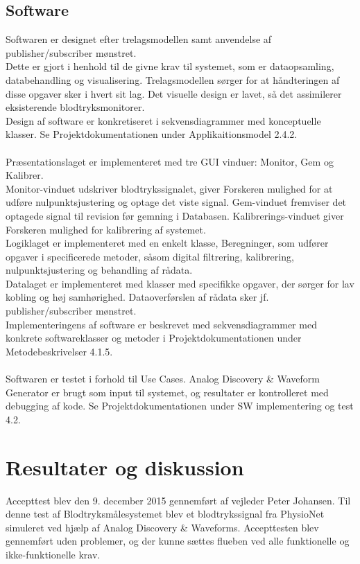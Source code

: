 \subsection{Software}
Softwaren er designet efter trelagsmodellen samt anvendelse af publisher/subscriber mønstret. \\
Dette er gjort i henhold til de givne krav til systemet, som er dataopsamling, databehandling og visualisering. Trelagsmodellen sørger for at håndteringen af disse opgaver sker i hvert sit lag. Det visuelle design er lavet, så det assimilerer eksisterende blodtryksmonitorer. \\
Design af software er konkretiseret i sekvensdiagrammer med konceptuelle klasser. Se Projektdokumentationen under Applikaitionsmodel 2.4.2.  
\\\\
Præsentationslaget er implementeret med tre GUI vinduer: Monitor, Gem og Kalibrer.\\ 
Monitor-vinduet udskriver blodtrykssignalet, giver Forskeren mulighed for at udføre nulpunktsjustering og optage det viste signal. Gem-vinduet fremviser det optagede signal til revision før gemning i Databasen. Kalibrerings-vinduet giver Forskeren mulighed for kalibrering af systemet.\\ 
Logiklaget er implementeret med en enkelt klasse, Beregninger, som udfører opgaver i specificerede metoder, såsom digital filtrering, kalibrering, nulpunktsjustering og behandling af rådata.\\
Datalaget er implementeret med klasser med specifikke opgaver, der sørger for lav kobling og høj samhørighed. Dataoverførslen af rådata sker jf. publisher/subscriber mønstret. \\
Implementeringens af software er beskrevet med sekvensdiagrammer med konkrete softwareklasser og metoder i Projektdokumentationen under Metodebeskrivelser 4.1.5.
\\\\
Softwaren er testet i forhold til Use Cases. Analog Discovery \& Waveform Generator er brugt som input til systemet, og resultater er kontrolleret med debugging af kode. Se Projektdokumentationen under SW implementering og test 4.2.


\section{Resultater og diskussion}
Accepttest blev den 9. december 2015 gennemført af vejleder Peter Johansen. Til denne test af Blodtryksmålesystemet blev et blodtrykssignal fra PhysioNet simuleret ved hjælp af Analog Discovery \& Waveforms. Accepttesten blev gennemført uden problemer, og der kunne sættes flueben ved alle funktionelle og ikke-funktionelle krav. 

